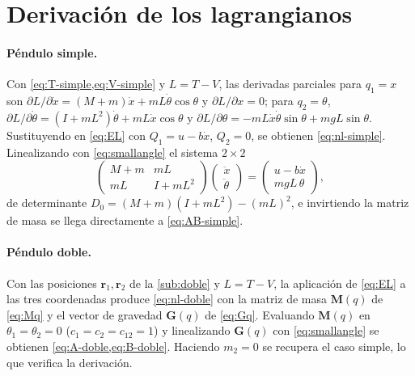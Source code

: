 \documentclass[11pt,letterpaper]{article}
\theoremstyle{definition}
\theoremstyle{plain}
\theoremstyle{remark}
\newcommand{\rv}{\bm{r}}
\begin{document}
\appendix
\renewcommand{\thesection}{\Alph{section}}

\section{Derivación de los lagrangianos}
\label{anx:lag}

\paragraph{Péndulo simple.} Con \cref{eq:T-simple,eq:V-simple} y
$L=T-V$, las derivadas parciales para $q_1=x$ son
$\partial L/\partial\dot x=(M{+}m)\dot x+mL\dot\theta\cos\theta$ y
$\partial L/\partial x=0$; para $q_2=\theta$,
$\partial L/\partial\dot\theta=(I{+}mL^2)\dot\theta+mL\dot x\cos\theta$ y
$\partial L/\partial\theta=-mL\dot x\dot\theta\sin\theta+mgL\sin\theta$.
Sustituyendo en \cref{eq:EL} con $Q_1=u-b\dot x$, $Q_2=0$, se obtienen
\cref{eq:nl-simple}. Linealizando con \cref{eq:smallangle} el sistema
$2\times2$
\begin{equation*}
\begin{pmatrix}M{+}m & mL\\ mL & I{+}mL^2\end{pmatrix}
\begin{pmatrix}\ddot x\\\ddot\theta\end{pmatrix}=
\begin{pmatrix}u-b\dot x\\ mgL\,\theta\end{pmatrix},
\end{equation*}
de determinante $D_0=(M{+}m)(I{+}mL^2)-(mL)^2$, e invirtiendo la matriz de
masa se llega directamente a \cref{eq:AB-simple}.

\paragraph{Péndulo doble.} Con las posiciones $\rv_1,\rv_2$ de la
\cref{sub:doble} y $L=T-V$, la aplicación de \cref{eq:EL} a las tres
coordenadas produce \cref{eq:nl-doble} con la matriz de masa
$\mathbf{M}(q)$ de \cref{eq:Mq} y el vector de gravedad $\mathbf{G}(q)$ de
\cref{eq:Gq}. Evaluando $\mathbf{M}(q)$ en $\theta_1=\theta_2=0$
($c_1=c_2=c_{12}=1$) y linealizando $\mathbf{G}(q)$ con
\cref{eq:smallangle} se obtienen \cref{eq:A-doble,eq:B-doble}. Haciendo
$m_2=0$ se recupera el caso simple, lo que verifica la derivación.
\end{document}

